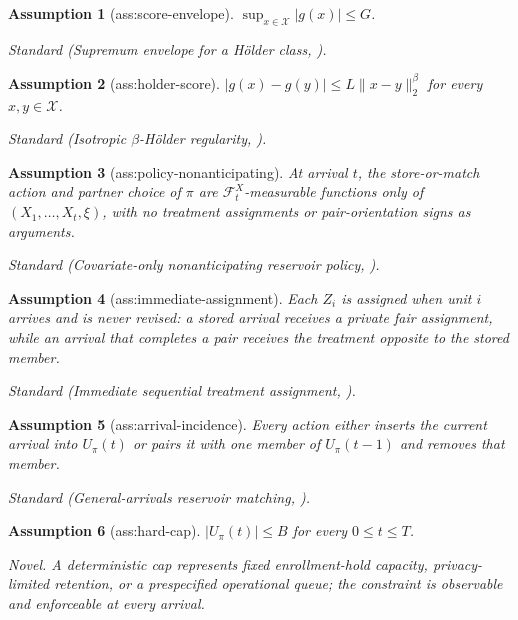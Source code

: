 \documentclass{article}
\newtheorem{assumption}{Assumption}
\begin{document}
\begin{assumption}[ass:score-envelope]\label{ass:score-envelope}
\(\sup_{x\in\mathcal X}|g(x)|\le G\).
\par\smallskip\noindent\emph{Standard} (Supremum envelope for a Hölder class, \cite{tsybakov2009introduction}).
\end{assumption}

\begin{assumption}[ass:holder-score]\label{ass:holder-score}
\(|g(x)-g(y)|\le L\|x-y\|_2^\beta\) for every \(x,y\in\mathcal X\).
\par\smallskip\noindent\emph{Standard} (Isotropic \(\beta\)-Hölder regularity, \cite{tsybakov2009introduction}).
\end{assumption}

\begin{assumption}[ass:policy-nonanticipating]\label{ass:policy-nonanticipating}
At arrival \(t\), the store-or-match action and partner choice of \(\pi\) are \(\mathcal F_t^X\)-measurable functions only of \((X_1,\ldots,X_t,\xi)\), with no treatment assignments or pair-orientation signs as arguments.
\par\smallskip\noindent\emph{Standard} (Covariate-only nonanticipating reservoir policy, \cite{morrison2025reservoir}).
\end{assumption}

\begin{assumption}[ass:immediate-assignment]\label{ass:immediate-assignment}
Each \(Z_i\) is assigned when unit \(i\) arrives and is never revised: a stored arrival receives a private fair assignment, while an arrival that completes a pair receives the treatment opposite to the stored member.
\par\smallskip\noindent\emph{Standard} (Immediate sequential treatment assignment, \cite{kapelnerkrieger2023learning}).
\end{assumption}

\begin{assumption}[ass:arrival-incidence]\label{ass:arrival-incidence}
Every action either inserts the current arrival into \(U_\pi(t)\) or pairs it with one member of \(U_\pi(t-1)\) and removes that member.
\par\smallskip\noindent\emph{Standard} (General-arrivals reservoir matching, \cite{morrison2025reservoir}).
\end{assumption}

\begin{assumption}[ass:hard-cap]\label{ass:hard-cap}
\(|U_\pi(t)|\le B\) for every \(0\le t\le T\).
\par\smallskip\noindent\emph{Novel.} A deterministic cap represents fixed enrollment-hold capacity, privacy-limited retention, or a prespecified operational queue; the constraint is observable and enforceable at every arrival.
\end{assumption}
\end{document}
